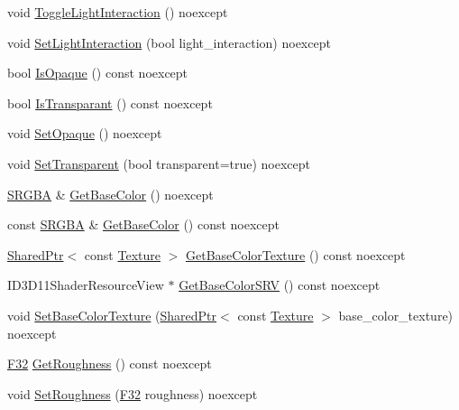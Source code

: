 \begin{DoxyCompactItemize}
\item 
void \hyperlink{classmage_1_1_material_a9c8c15d426461b4a597b9a9947a7bd62}{Toggle\+Light\+Interaction} () noexcept
\item 
void \hyperlink{classmage_1_1_material_a9b0bcb448cf9c96bcb63dcbc0f110bd1}{Set\+Light\+Interaction} (bool light\+\_\+interaction) noexcept
\item 
bool \hyperlink{classmage_1_1_material_a0df1804c29bfd9d2bbc606d6285dccec}{Is\+Opaque} () const noexcept
\item 
bool \hyperlink{classmage_1_1_material_a6a62e3889887e77259070e1f9cd9150f}{Is\+Transparant} () const noexcept
\item 
void \hyperlink{classmage_1_1_material_ab3c49ab54603adebb1d08803fc700fc9}{Set\+Opaque} () noexcept
\item 
void \hyperlink{classmage_1_1_material_abf7e618017185ea05c72d050e89018fe}{Set\+Transparent} (bool transparent=true) noexcept
\item 
\hyperlink{structmage_1_1_s_r_g_b_a}{S\+R\+G\+BA} \& \hyperlink{classmage_1_1_material_a8c6c6e3bb527b98320446206306c6979}{Get\+Base\+Color} () noexcept
\item 
const \hyperlink{structmage_1_1_s_r_g_b_a}{S\+R\+G\+BA} \& \hyperlink{classmage_1_1_material_abadf5557a1047cb7c371c715e99876a3}{Get\+Base\+Color} () const noexcept
\item 
\hyperlink{namespacemage_a1e01ae66713838a7a67d30e44c67703e}{Shared\+Ptr}$<$ const \hyperlink{classmage_1_1_texture}{Texture} $>$ \hyperlink{classmage_1_1_material_a76b84c808a281589d60ebbe2e2932c01}{Get\+Base\+Color\+Texture} () const noexcept
\item 
I\+D3\+D11\+Shader\+Resource\+View $\ast$ \hyperlink{classmage_1_1_material_aef6ae5f87347d9e4bf798079aa906dd3}{Get\+Base\+Color\+S\+RV} () const noexcept
\item 
void \hyperlink{classmage_1_1_material_a85f9544a9d26f252a27a3bc6c271456a}{Set\+Base\+Color\+Texture} (\hyperlink{namespacemage_a1e01ae66713838a7a67d30e44c67703e}{Shared\+Ptr}$<$ const \hyperlink{classmage_1_1_texture}{Texture} $>$ base\+\_\+color\+\_\+texture) noexcept
\item 
\hyperlink{namespacemage_aa97e833b45f06d60a0a9c4fc22ae02c0}{F32} \hyperlink{classmage_1_1_material_a5b1a4e965f812e18594cf7455d49139c}{Get\+Roughness} () const noexcept
\item 
void \hyperlink{classmage_1_1_material_ad1df4026da1b5abc3924c7ce09a81a02}{Set\+Roughness} (\hyperlink{namespacemage_aa97e833b45f06d60a0a9c4fc22ae02c0}{F32} roughness) noexcept

\end{DoxyCompactItemize}
